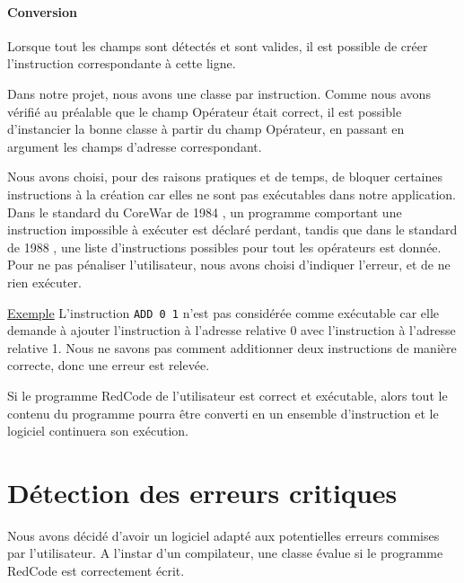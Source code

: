 \documentclass[hidelinks]{report}
\begin{document}
\paragraph{Conversion\label{paraph:conversion}}

Lorsque tout les champs sont détectés et sont valides, il est possible de créer l'instruction correspondante à cette ligne.

Dans notre projet, nous avons une classe par instruction. Comme nous avons vérifié au préalable que le champ Opérateur était correct, il est possible d'instancier la bonne classe à partir du champ Opérateur, en passant en argument les champs d'adresse correspondant.

Nous avons choisi, pour des raisons pratiques et de temps, de bloquer certaines instructions à la création car elles ne sont pas exécutables dans notre application. Dans le standard du CoreWar de 1984 , un programme comportant une instruction impossible à exécuter est déclaré perdant, tandis que dans le standard de 1988 , une liste d'instructions possibles pour tout les opérateurs est donnée. Pour ne pas pénaliser l'utilisateur, nous avons choisi d'indiquer l'erreur, et de ne rien exécuter. 

\begin{flushleft}
\underline{Exemple\label{paraph:exemple}}
L'instruction \texttt{ADD 0 1} n'est pas considérée comme exécutable car elle demande à ajouter l'instruction à l'adresse relative 0 avec l'instruction à l'adresse relative 1. Nous ne savons pas comment additionner deux instructions de manière correcte, donc une erreur est relevée.
\end{flushleft}

Si le programme RedCode de l'utilisateur est correct et exécutable, alors tout le contenu du programme pourra être converti en un ensemble d'instruction et le logiciel continuera son exécution.


\section{Détection des erreurs critiques\label{sec:errors}}

Nous avons décidé d'avoir un logiciel adapté aux potentielles erreurs commises par l'utilisateur. A l'instar d'un compilateur, une classe évalue si le programme RedCode est correctement écrit.
\end{document}
